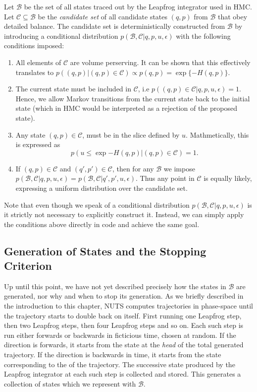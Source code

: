 Let $\mathcal{B}$ be the set of all states traced out by the Leapfrog integrator used in HMC. Let $\mathcal{C} \subseteq \mathcal{B}$ be 
the \textit{candidate set} of all candidate states $(q, p)$ from $\mathcal{B}$ that obey detailed balance. The candidate set is deterministically constructed from $\mathcal{B}$ by introducing a conditional distribution $p(\mathcal{B}, \mathcal{C}|q, p, u, \epsilon)$ with the following conditions imposed:
\begin{enumerate}
    \item All elements of $\mathcal{C}$ are volume perserving. It can be shown that this effectively translates to $p((q, p)|(q, p) \in \mathcal{C}) \propto p(q, p) = \exp\{-H(q, p)\}$.
    \item The current state must be included in $\mathcal{C}$, i.e $p\left((q, p) \in \mathcal{C}|q, p, u, \epsilon\right) = 1$. Hence, we allow Markov transitions from the current state back to the initial state (which in HMC would be interpreted as a rejection of the proposed state).
    \item Any state $(q, p) \in \mathcal{C}$, must be in the slice defined by $u$. 
    Mathmetically, this is expressed as $$p\left(u\leq \exp{-H(q, p)}\bigg|(q, p) \in \mathcal{C}\right) = 1.$$
    \item If $(q, p) \in \mathcal{C}$ and $(q', p') \in \mathcal{C}$, then for any $\mathcal{B}$ we impose 
    $p(\mathcal{B}, \mathcal{C}|q, p, u, \epsilon) = p(\mathcal{B}, \mathcal{C}|q', p', u, \epsilon)$.
    Thus any point in $\mathcal{C}$ is equally likely, expressing a uniform distribution over the candidate set.
\end{enumerate}
Note that even though we speak of a conditional distribution $p(\mathcal{B}, \mathcal{C}|q, p, u, \epsilon)$ is it strictly not necessary to explicitly construct it. Instead, we can simply apply the conditions above directly in code and achieve the same goal.


\subsection{Generation of States and the Stopping Criterion}
Up until this point, we have not yet described precisely how the states in $\mathcal{B}$ are generated,
nor why and when to stop its generation. As we briefly described in the introduction to this chapter, 
NUTS computes trajectories in phase-space until the trajectory starts to double back on itself. First running one Leapfrog step,
then two Leapfrog steps, then four Leapfrog steps and so on. Each such step is run either forwards or backwards in ficticious time, chosen at random.
If the direction is forwards, it starts from the state at the \textit{head} of the total generated trajectory. If the direction is backwards in time, it starts from the state corresponding to the  of the trajectory.
The successive state produced by the Leapfrog integrator at each such step is collected and stored. This generates a collection of states which we represent with $\mathcal{B}$. 

